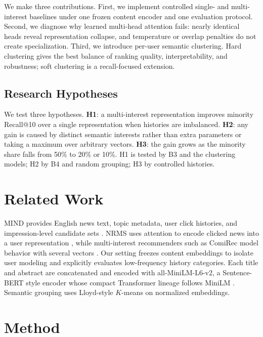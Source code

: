 We make three contributions. First, we implement controlled single- and multi-interest baselines under one frozen content encoder and one evaluation protocol. Second, we diagnose why learned multi-head attention fails: nearly identical heads reveal representation collapse, and temperature or overlap penalties do not create specialization. Third, we introduce per-user semantic clustering. Hard clustering gives the best balance of ranking quality, interpretability, and robustness; soft clustering is a recall-focused extension.

\subsection{Research Hypotheses}
We test three hypotheses. \textbf{H1}: a multi-interest representation improves minority Recall@10 over a single representation when histories are imbalanced. \textbf{H2}: any gain is caused by distinct semantic interests rather than extra parameters or taking a maximum over arbitrary vectors. \textbf{H3}: the gain grows as the minority share falls from 50\% to 20\% or 10\%. H1 is tested by B3 and the clustering models; H2 by B4 and random grouping; H3 by controlled histories.

\section{Related Work}
MIND provides English news text, topic metadata, user click histories, and impression-level candidate sets \cite{wu2020mind}. NRMS uses attention to encode clicked news into a user representation \cite{wu2019nrms}, while multi-interest recommenders such as ComiRec model behavior with several vectors \cite{cen2020comirec}. Our setting freezes content embeddings to isolate user modeling and explicitly evaluates low-frequency history categories. Each title and abstract are concatenated and encoded with all-MiniLM-L6-v2, a Sentence-BERT style encoder \cite{reimers2019sbert} whose compact Transformer lineage follows MiniLM \cite{wang2020minilm}. Semantic grouping uses Lloyd-style $K$-means \cite{lloyd1982} on normalized embeddings.

\section{Method}
